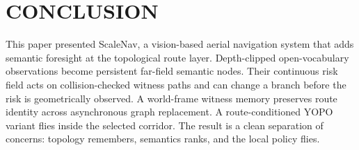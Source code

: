 \documentclass[letterpaper,10pt,conference]{ieeeconf}
\begin{document}
\section{CONCLUSION}
This paper presented ScaleNav, a vision-based aerial navigation system that
adds semantic foresight at the topological route layer.
Depth-clipped open-vocabulary observations become persistent far-field
semantic nodes. Their continuous risk field acts on collision-checked
witness paths and can change a branch before the risk is geometrically
observed.
A world-frame witness memory preserves route identity across asynchronous
graph replacement. A route-conditioned YOPO variant flies inside the
selected corridor.
The result is a clean separation of concerns: topology remembers, semantics
ranks, and the local policy flies.
\end{document}
